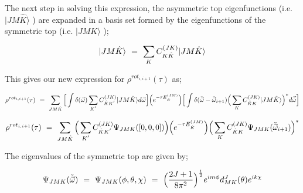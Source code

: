 \documentclass[11pt]{article}
\providecommand{\Tilde}{\tilde}
\begin{document}
The next step in solving this expression, the asymmetric top eigenfunctions (i.e. \begin{math} | JM\hat{K} \rangle  \end{math} ) are expanded in a basis set formed by the eigenfunctions of the symmetric top (i.e. \begin{math} | JMK \rangle  \end{math} );

\begin{equation}
    | JM\hat{K} \rangle \hspace{0.125cm} = \hspace{0.125cm} \sum_{K} C_{K \hat{K}}^{(JK)} | JM\hat{K} \rangle  
\end{equation}

This gives our new expression for \begin{math}  \rho^{rot_{i, i+1}} ( \tau ) \end{math} as;

\begin{equation}
    \rho^{rot_{i, i+1}} ( \tau ) \hspace{0.125cm} = \hspace{0.125cm} \sum_{J M \hat{K}} \Big[ \int \delta ( \vec{\omega} ) \sum_{K^{'}} C_{\hat{K} K^{'}}^{(JK)} | JM\hat{K}  \rangle d \vec{\omega} \Big] \Big( e^{- \tau E_{\hat{K}}^{(JM)}} \Big) \Big[ \int \delta ( \Tilde{\vec{\omega}} - \Tilde{\vec{\omega}}_{i+1} ) \Big( \sum_{K} C_{\hat{K} K}^{(JK)} | JM\hat{K}  \rangle \Big)^{*} d \vec{\Tilde{\omega}} \Big]
\end{equation}

\begin{equation}
    \rho^{rot_{i, i+1}} ( \tau ) \hspace{0.125cm} = \hspace{0.125cm} \sum_{J M \hat{K}} \Big( \sum_{K^{'}} C_{\hat{K} K^{'}}^{(JK)} \Psi_{JMK} ( [0, 0, 0] ) \Big) \Big( e^{- \tau E_{\hat{K}}^{(JM)}} \Big) \Big( \sum_{K} C_{\hat{K} K}^{(JK)} \Psi_{JMK} ( \Tilde{\vec{\omega}}_{i+1} ) \Big)^{*} 
\end{equation}

The eigenvalues of the symmetric top are given by;

\begin{equation}
   \Psi_{JMK} ( \Tilde{\vec{\omega}} ) \hspace{0.125cm} = \hspace{0.125cm} \Psi_{JMK} ( \phi , \theta, \chi ) \hspace{0.125cm} = \hspace{0.125cm} \Big( \frac{2 J + 1}{8 \pi^2} \Big)^{\frac{1}{2}} e^{i m \phi} d_{MK}^{J} (\theta )  e^{i k \chi}
\end{equation}
\end{document}
